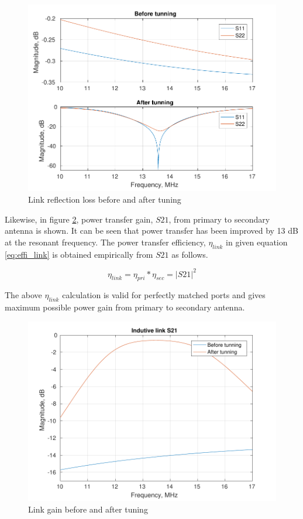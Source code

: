 \documentclass[UKenglish]{ifimaster}  %
\begin{document}
\begin{figure} [!htbp]
  \centering
  \includegraphics[width=\textwidth]{img/ant_s1_s2_both.pdf} 
 \caption{Link reflection loss before and after tuning} 
\label{fig:ant_S_loss} 
\end{figure}

Likewise, in figure \ref{fig:ant_S_gain}, power transfer gain, $S21$, from primary to secondary antenna is shown. It can be seen that  power transfer has been improved by 13 dB at the resonant frequency. The power transfer efficiency, $\eta_{link}$ in given equation \ref{eq:effi_link} is obtained empirically from $S21$ as follows.

\begin{equation} \label{eq:effi_link_s21}	%
\eta_{link} = \eta_{pri}*\eta_{sec} = |S21|^{2}
\end{equation} 

The above $\eta_{link}$ calculation is valid for perfectly matched ports and gives maximum possible power gain from primary to secondary antenna. \\

\begin{figure} [!htbp]
  \centering
  \includegraphics[width=\textwidth]{img/ant_s21_both.pdf}
 \caption{Link gain before and after tuning} 
\label{fig:ant_S_gain} 
\end{figure}
\end{document}
